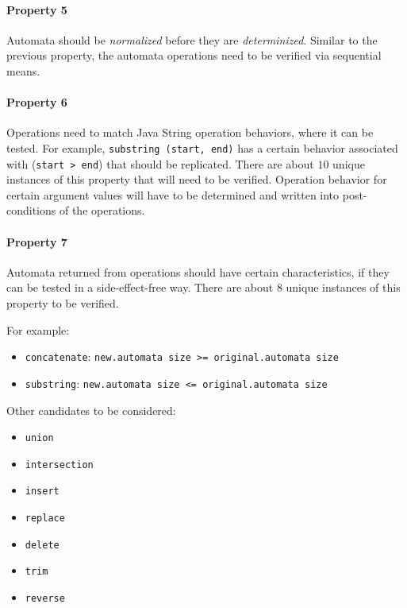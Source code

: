\documentclass[letterpaper,11pt,twocolumn]{article}
\begin{document}
\paragraph{Property 5} Automata should be \textit{normalized} before they are
\textit{determinized}.  Similar to the previous property, the automata
operations need to be verified via sequential means.

\paragraph{Property 6} Operations need to match Java String operation
behaviors, where it can be tested.  For example, \texttt{substring~(start,
  end)} has a certain behavior associated with (\texttt{start > end}) that
should be replicated. There are about \(10\) unique instances of this property
that will need to be verified.  Operation behavior for certain argument values
will have to be determined and written into post-conditions of the operations.

\paragraph{Property 7} Automata returned from operations should have certain
characteristics, if they can be tested in a side-effect-free way.  There are
about \(8\) unique instances of this property to be verified.

For example:

\begin{itemize}
\item{\texttt{concatenate}: \texttt{new.automata size >= original.automata
      size}}
\item{\texttt{substring}: \texttt{new.automata size <= original.automata size}}
\end{itemize}

Other candidates to be considered:

\begin{itemize}
\item{\texttt{union}}
\item{\texttt{intersection}}
\item{\texttt{insert}}
\item{\texttt{replace}}
\item{\texttt{delete}}
\item{\texttt{trim}}
\item{\texttt{reverse}}
\end{itemize}
\end{document}
